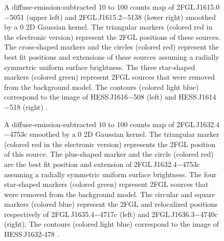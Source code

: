 \documentclass[12pt,preprint]{aastex}
\newif\ifcolorfigure
\newcommand{\gev}{\text{GeV}\xspace}
\newcommand{\tev}{\text{TeV}\xspace}
\begin{document}
\begin{figure}
    \ifcolorfigure
      \plotone{source_plots/source_HESS_J1614-518_color.eps}
    \else
    \fi
  \caption{
    A diffuse-emission-subtracted 10 \gev to 100 \gev counts
    map of 2FGL\,J1615.0$-$5051 (upper left)
    and 2FGL\,J1615.2$-$5138 (lower right) smoothed by a 0
    2D Gaussian kernel.  The triangular markers (colored red in the
    electronic version) represent the 2FGL positions of these sources.
    The cross-shaped markers and the
    circles (colored red) represent the best fit
    positions and extensions of these sources assuming a radially
    symmetric uniform surface brightness.  The three star-shaped
    markers (colored
    green) represent 2FGL sources that were removed from the background
    model.  The contours (colored light blue) correspond to the \tev
    image of HESS\,J1616$-$508 (left) and HESS\,J1614$-$518 (right)
    \citep{hess_plane_survey}.   
    }\label{1FGL_J1613.6-5100c}
\end{figure}

\begin{figure}
    \ifcolorfigure
      \plotone{source_plots/source_HESS_J1632-478_color.eps}
    \else
    \fi
  \caption{A diffuse-emission-subtracted 10 \gev to 100 \gev counts map of
  2FGL\,J1632.4$-$4753c smoothed by a 0 2D Gaussian
  kernel.  The triangular marker (colored red in the electronic version)
  represents the 2FGL position of this source.  The plus-shaped marker
  and the circle (colored red) are the best fit position and extension of
  2FGL\,J1632.4$-$4753c assuming a radially symmetric uniform surface
  brightness.  The four star-shaped markers (colored green) represent 2FGL
  sources that were removed from the background model.  The circular
  and square markers (colored blue) represent the 2FGL and relocalized
  positions respectively of 2FGL\,J1635.4$-$4717c (left)
  and 2FGL\,J1636.3$-$4740c (right).  
  The contours (colored light blue) correspond to the \tev image of
  HESS\,J1632-478 \citep{hess_plane_survey}.
  }\label{1FGL_J1632.9-4802c}
\end{figure}
\end{document}
